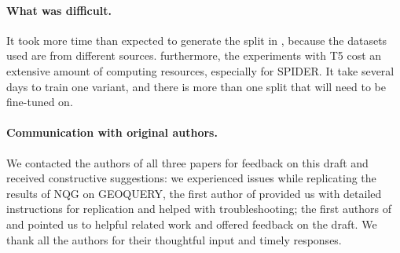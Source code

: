 
\vspace{-3mm}
\paragraph{What was difficult.}

It took more time than expected to generate the split in \cite{shaw-etal-2021-compositional}, because the datasets used are from different sources.
%
furthermore, the experiments with T5 cost an extensive amount of computing resources, especially for SPIDER. %
It take several days to train one variant, and there is more than one split that will need to be fine-tuned on.


\vspace{-3mm}
\paragraph{Communication with original authors.}

We contacted the authors of all three papers for feedback on this draft and received constructive suggestions: we experienced issues while replicating the results of NQG on GEOQUERY, the first author of \cite{shaw-etal-2021-compositional} provided us with detailed instructions for replication and helped with troubleshooting; the first authors of \cite{kim-linzen-2020-cogs} and \cite{kim2021sequencetosequence} pointed us to helpful related work and offered feedback on the draft.
We thank all the authors for their thoughtful input and timely responses.
